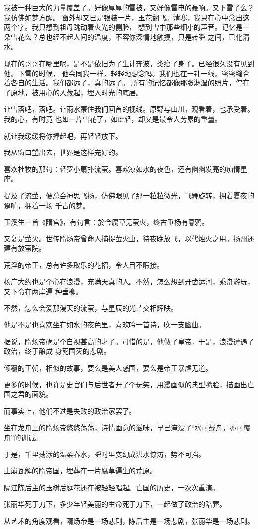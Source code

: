		我被一种巨大的力量覆盖了。好像厚厚的雪被，又好像雷电的轰响。又下雪了么？我仿佛如梦方醒。
	窗外却又已是银装一片，玉花翻飞。清寒，我只在心中念出这两个字。我只想到祖母跳动着火光的侧脸，
	想到雪中那些细小的声音。记忆是一朵雪花么？总也经不起人间的温度，不容你深情地触摸，只是转瞬
	之间，已化清水。

		现在的哥哥在哪里呢，是不是依旧为了生计奔波，类瘦了身子。已经很久没有见到他。下雪的时候，
	他会同我一样，轻轻地想念吗。我们也在一针一线。密密缝合着各自的生活。我们都远了，真的远了。
	所有的记忆都像那张淋湿的照片，停在了原地，被用心的人藏起，埋入时光的底层。

		让雪落吧，落吧。让雨水蒙住我们回首的视线。原野与山川，观看着，也承受着。我的心，有时竟
	也如一片雪花了，如此轻，却又是最令人劳累的重量。

		就让我缓缓将你捧起吧，再轻轻放下。

		我从窗口望出去，世界是这样完好的。

	\endwriting



		喜欢杜牧的那句：轻罗小扇扑流萤。喜欢凉如水的夜色，还有幽幽发亮的痴情星座。

		提及了流萤，便总会神思飞扬，仿佛眼见了那一粒粒微光，飞舞旋转，拥着夏夜的跫响，拥着一场
	千古的梦。

		玉溪生一首《隋宫》，有句言：於今腐草无萤火，终古垂杨有暮鸦。

		又复是萤火。世传隋炀帝曾命人捕捉萤火虫，待夜晚放飞，以代烛火之用。扬州还建有放萤院。

		荒淫的帝王，总有许多取乐的花招，令人目不暇接。

		杨广大约也是个心存浪漫，充满天真的人。不然，怎么想到开凿运河，乘舟游玩，又下令在两岸遍
	种垂柳。

		不然，怎么会爱那漫天的流萤，与星辰的光芒交相辉映。\par
		他是不是也喜欢坐在如水的夜色里，喜欢吟一首诗，吹一支幽曲。

		据说，隋炀帝确是个自视甚高的才子。可惜的是，他做了皇帝，于是，浪漫遭遇了政治，终于酿成
	身死国灭的悲剧。

		倾覆的王朝，相似的故事，要么是美人惑国，要么是帝王暴虐无道。\par
		更多的时候，也许是史官们与后世者开了个玩笑，用漫画似的典型嘴脸，描画出亡国之君的面貌。\par
		而事实上，他们不过是失败的政治家罢了。

		坐在龙舟上的隋炀帝悠悠荡荡，诗情画意的滋味，早已淹没了“水可载舟，亦可覆舟”的训诫。\par
		于是，千里荡漾的温柔春水，瞬时里变幻成洪水惊涛，势不可挡。\par
		土崩瓦解的隋帝国，埋葬在一片腐草遍生的荒原。\par
		隔江陈后主的玉树后庭花还在被轻轻唱起。亡国的历史，一次次重演。\par
		张丽华死于刀下，多少年轻美丽的生命死于刀下，一起做了政治的陪葬。\par
		从艺术的角度观看，隋炀帝是一场悲剧，陈后主是一场悲剧，张丽华是一场悲剧。

